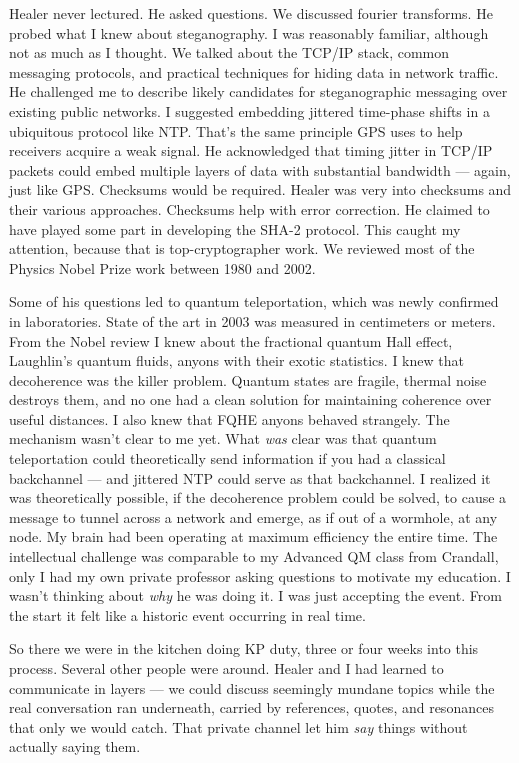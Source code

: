 Healer never lectured. He asked questions. We discussed fourier transforms. He probed what I knew about steganography. I was reasonably familiar, although not as much as I thought. We talked about the TCP/IP stack, common messaging protocols, and practical techniques for hiding data in network traffic. He challenged me to describe likely candidates for steganographic messaging over existing public networks. I suggested embedding jittered time-phase shifts in a ubiquitous protocol like NTP.  That's the same principle GPS uses to help receivers acquire a weak signal. He acknowledged that timing jitter in TCP/IP packets could embed multiple layers of data with substantial bandwidth --- again, just like GPS. Checksums would be required. Healer was very into checksums and their various approaches. Checksums help with error correction. He claimed to have played some part in developing the SHA-2 protocol. This caught my attention, because that is top-cryptographer work. We reviewed most of the Physics Nobel Prize work between 1980 and 2002.

Some of his questions led to quantum teleportation, which was newly confirmed in laboratories. State of the art in 2003 was measured in centimeters or meters. From the Nobel review I knew about the fractional quantum Hall effect, Laughlin's quantum fluids, anyons with their exotic statistics. I knew that decoherence was the killer problem. Quantum states are fragile, thermal noise destroys them, and no one had a clean solution for maintaining coherence over useful distances. I also knew that FQHE anyons behaved strangely. The mechanism wasn't clear to me yet. What \textit{was} clear was that quantum teleportation could theoretically send information if you had a classical backchannel --- and jittered NTP could serve as that backchannel. I realized it was theoretically possible, if the decoherence problem could be solved, to cause a message to tunnel across a network and emerge, as if out of a wormhole, at any node. My brain had been operating at maximum efficiency the entire time. The intellectual challenge was comparable to my Advanced QM class from Crandall, only I had my own private professor asking questions to motivate my education. I wasn't thinking about \textit{why} he was doing it. I was just accepting the event. From the start it felt like a historic event occurring in real time.

So there we were in the kitchen doing KP duty, three or four weeks into this process. Several other people were around. Healer and I had learned to communicate in layers --- we could discuss seemingly mundane topics while the real conversation ran underneath, carried by references, quotes, and resonances that only we would catch. That private channel let him \textit{say} things without actually saying them.

